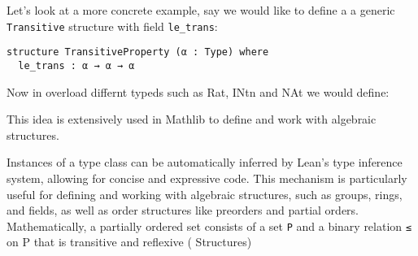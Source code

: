 Let's look at a more concrete example, say we would like to define a a generic \lstinline[language=lean]|Transitive| 
structure with field \lstinline[language=lean]|le_trans|:
\begin{lstlisting}[language=lean]
structure TransitiveProperty (α : Type) where
  le_trans : α → α → α
\end{lstlisting}
Now in overload differnt typeds such as Rat, INtn and NAt we would define:




This idea is extensively used in Mathlib to define and work with algebraic structures.

Instances of a type class can be automatically inferred by Lean's type inference system,
allowing for concise and expressive code.
This mechanism is particularly useful for defining and working with algebraic structures,
such as groups, rings, and fields, as well as order structures like preorders and partial orders.
Mathematically, a partially ordered set consists of a set \lstinline[language=lean]|P| 
and a binary relation 
\lstinline[language=lean]|≤| 
on P that is transitive and reflexive (\cite{mathinlean} Structures)



